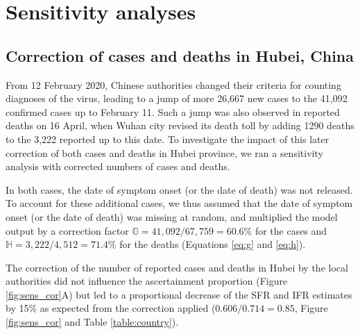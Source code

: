 \documentclass{article}
\begin{document}
\clearpage
\section{Sensitivity analyses}
\label{sst}

\subsection{Correction of cases and deaths in Hubei, China}
From 12 February 2020, Chinese authorities changed their criteria for counting diagnoses of the virus, leading to a jump of more 26,667 new cases to the 41,092 confirmed cases up to February 11. Such a jump was also observed in reported deaths on 16 April, when Wuhan city revised its death toll by adding 1290 deaths to the 3,222 reported up to this date. To investigate the impact of this later correction of both cases and deaths in Hubei province, we ran a sensitivity analysis with corrected numbers of cases and deaths. 

In both cases, the date of symptom onset (or the date of death) was not released. To account for these additional cases, we thus assumed that the date of symptom onset (or the date of death) was missing at random, and multiplied the model output by a correction factor $\mathds{G}=41,092/67,759=60.6\%$ for the cases and $\mathds{H}=3,222/4,512=71.4\%$ for the deaths (Equations \ref{eq:g} and  \ref{eq:h}).

The correction of the number of reported cases and deaths in Hubei by the local authorities did not influence the ascertainment proportion (Figure \ref{fig:sens_cor}A) but led to a proportional decrease of the SFR and IFR estimates by 15\% as expected from the correction applied ($0.606/0.714=0.85$, Figure \ref{fig:sens_cor} and Table \ref{table:country}).
\end{document}
